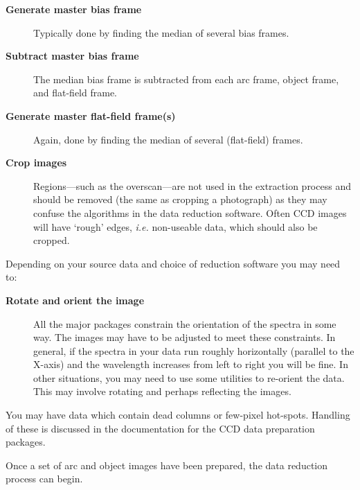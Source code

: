 \documentclass[twoside,11pt]{article}
\newcommand{\htmlref}[2]{#1}
\newcommand{\scspec}[2]{#1}
\newcommand{\scspec}[2]{#2}
\begin{document}
\begin{description}

\item [{\bf Generate master \htmlref{bias frame}{gl_bias_frame}}]
      Typically done by finding the median of several bias frames.

\item [{\bf Subtract master bias frame}]
      The median bias frame is subtracted from each arc frame,
      object frame, and flat-field frame.

\item [{\bf Generate master \htmlref{flat-field frame(s)}{gl_flat_field}}]
      Again, done by finding the median of several (flat-field) frames.

\item [{\bf Crop images}]
      Regions\scspec{---}{ - }such as the overscan\scspec{---}{ - }are
      not used in the extraction process and should be removed (the same
      as cropping a photograph) as they may confuse the algorithms in
      the data reduction software.
      Often CCD images will have `rough' edges, {\em i.e.} non-useable
      data, which should also be cropped.

\end{description}

Depending on your source data and choice of reduction software you may
need to:

\begin{description}

\item [{\bf Rotate and orient the image}]
      All the major packages constrain the orientation of the spectra
      in some way.
      The images may have to be adjusted to meet these constraints.
      In general, if the spectra in your data run roughly
      horizontally (parallel to the X-axis) and the wavelength increases
      from left to right you will be fine.
      In other situations, you may need to use some utilities to
      re-orient the data.
      This may involve rotating and perhaps reflecting the images.

\end{description}

You may have data which contain \htmlref{dead columns}{gl_dead_column} or
few-pixel \htmlref{hot-spots}{gl_hotspot}.
Handling of these is discussed in the documentation for the CCD data
preparation packages.

Once a set of arc and object images have been prepared, the data
reduction process can begin.
\end{document}
